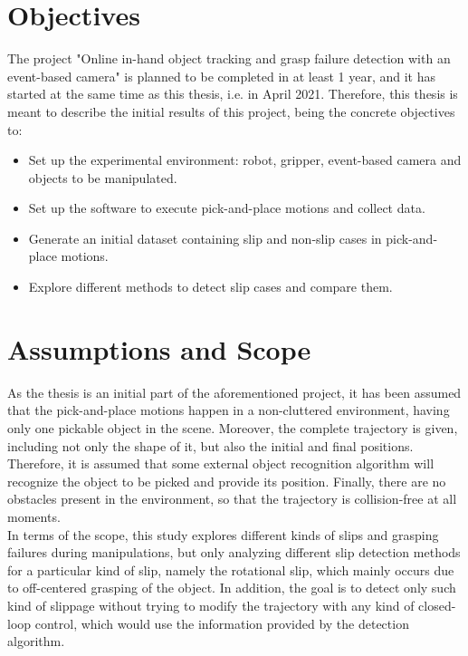 \section{Objectives}

The project "Online in-hand object tracking and grasp failure detection with an event-based camera" is planned to be completed in at least 1 year, and it has started at the same time as this thesis, i.e. in April 2021. Therefore, this thesis is meant to describe the initial results of this project, being the concrete objectives to:

\begin{itemize}
	\item Set up the experimental environment: robot, gripper, event-based camera and objects to be manipulated.
	\item Set up the software to execute pick-and-place motions and collect data.
	\item Generate an initial dataset containing slip and non-slip cases in pick-and-place motions.
	\item Explore different methods to detect slip cases and compare them.
\end{itemize}

\section{Assumptions and Scope}

As the thesis is an initial part of the aforementioned project, it has been assumed that the pick-and-place motions happen in a non-cluttered environment, having only one pickable object in the scene. Moreover, the complete trajectory is given, including not only the shape of it, but also the initial and final positions. Therefore, it is assumed that some external object recognition algorithm will recognize the object to be picked and provide its position. Finally, there are no obstacles present in the environment, so that the trajectory is collision-free at all moments.\\

In terms of the scope, this study explores different kinds of slips and grasping failures during manipulations, but only analyzing different slip detection methods for a particular kind of slip, namely the rotational slip, which mainly occurs due to off-centered grasping of the object. In addition, the goal is to detect only such kind of slippage without trying to modify the trajectory with any kind of closed-loop control, which would use the information provided by the detection algorithm.

